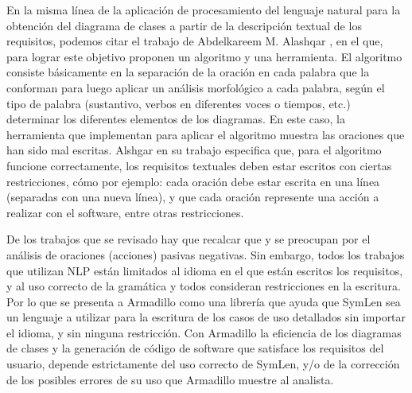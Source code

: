 En la misma línea de la aplicación de procesamiento del lenguaje natural para la obtención del diagrama de clases a partir de la descripción textual de los requisitos, podemos citar el trabajo de Abdelkareem M. Alashqar \cite{Alashqar2021}, en el que, para lograr este objetivo proponen un algoritmo y una herramienta. El algoritmo consiste básicamente en la separación de la oración en cada palabra que la conforman para luego aplicar un análisis morfológico a cada palabra, según el tipo de palabra (sustantivo, verbos en diferentes voces o tiempos, etc.) determinar los diferentes elementos de los diagramas. En este caso, la herramienta que implementan para aplicar el algoritmo muestra las oraciones que han sido mal escritas. Alshgar en su trabajo \cite{Alashqar2021} especifica que, para el algoritmo funcione correctamente, los requisitos textuales deben estar escritos con ciertas restricciones, cómo por ejemplo: cada oración debe estar escrita en una línea (separadas con una nueva línea), y que cada oración represente una acción a realizar con el software, entre otras restricciones. 

De los trabajos que se revisado hay que recalcar que \cite{Alashqar2021} y \cite{Shweta2020} se preocupan por el análisis de oraciones (acciones) pasivas negativas. Sin embargo, todos los trabajos que utilizan NLP están limitados al idioma en el que están escritos los requisitos, y al uso correcto de la gramática y todos consideran restricciones en la escritura. Por lo que se presenta a Armadillo como una librería que ayuda que SymLen sea un lenguaje a utilizar para la escritura de los casos de uso detallados sin importar el idioma, y sin ninguna restricción. Con Armadillo la eficiencia de los diagramas de clases y la generación de código de software que satisface los requisitos del usuario, depende estrictamente del uso correcto de SymLen, y/o de la corrección de los posibles errores de su uso que Armadillo muestre al analista.



